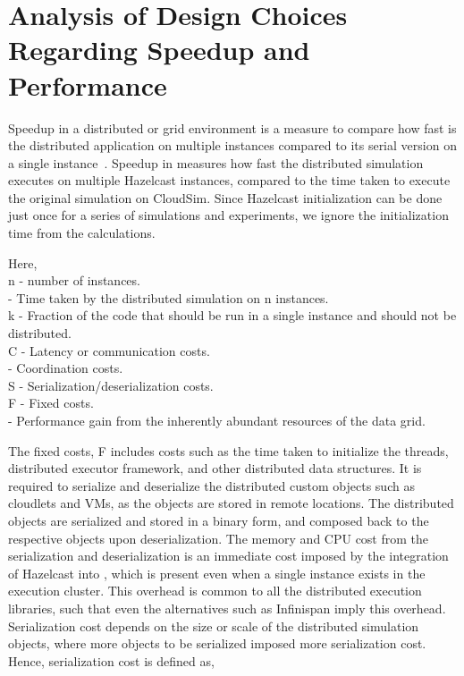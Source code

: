 \section{Analysis of Design Choices Regarding Speedup and Performance}
\label{sec:3perf}
Speedup in a distributed or grid environment is a measure to compare how fast is the distributed application on multiple instances compared to its serial version on a single instance~\cite{hoekstra2005introducing}. Speedup in  measures how fast the distributed simulation executes on multiple Hazelcast instances, compared to the time taken to execute the original simulation on CloudSim. Since Hazelcast initialization can be done just once for a series of simulations and experiments, we ignore the initialization time from the calculations.


Here,\\
n - number of instances.\\
 - Time taken by the distributed simulation on n instances.\\
k - Fraction of the code that should be run in a single instance and should not be distributed.\\
C - Latency or communication costs.\\
 - Coordination costs.\\
S - Serialization/deserialization costs.\\
F - Fixed costs.\\
 - Performance gain from the inherently abundant resources of the data grid.

The fixed costs, F includes costs such as the time taken to initialize the threads, distributed executor framework, and other distributed data structures. It is required to serialize and deserialize the distributed custom objects such as cloudlets and VMs, as the objects are stored in remote locations. The distributed objects are serialized and stored in a binary form, and composed back to the respective objects upon deserialization. The memory and CPU cost from the serialization and deserialization is an immediate cost imposed by the integration of Hazelcast into , which is present even when a single instance exists in the execution cluster. This overhead is common to all the distributed execution libraries, such that even the alternatives such as Infinispan imply this overhead. Serialization cost depends on the size or scale of the distributed simulation objects, where more objects to be serialized imposed more serialization cost. Hence, serialization cost is defined as,

